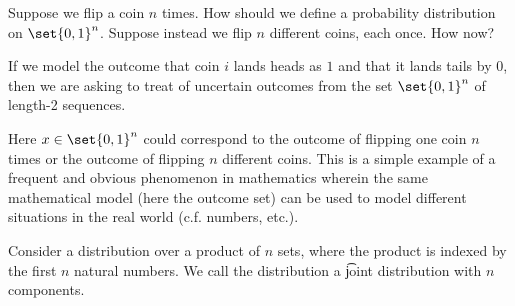 

Suppose we flip a coin $n$ times.
How should we define a probability distribution on $\set{0, 1}^n$.
Suppose instead we flip $n$ different coins, each once.
How now?


If we model the outcome that coin $i$ lands heads as $1$ and that it lands tails by $0$, then we are asking to treat of uncertain outcomes from the set $\set{0, 1}^n$ of length-2 sequences.

Here $x \in \set{0, 1}^n$ could correspond to the outcome of flipping one coin $n$ times or the outcome of flipping $n$ different coins.
This is a simple example of a frequent and obvious phenomenon in mathematics wherein the same mathematical model (here the outcome set) can be used to model different situations in the real world (c.f. numbers, etc.).


Consider a distribution over a product of $n$ sets, where the product is indexed by the first $n$ natural numbers.
We call the distribution a \t{joint distribution} with $n$ components.

\blankpage
